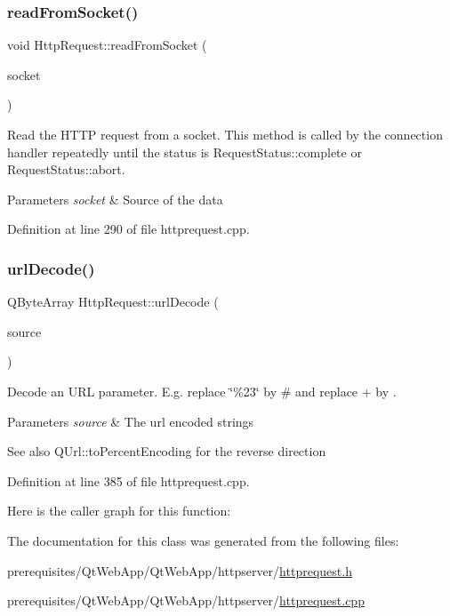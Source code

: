 \subsubsection{\texorpdfstring{read\+From\+Socket()}{readFromSocket()}}
{\footnotesize\ttfamily void Http\+Request\+::read\+From\+Socket (\begin{DoxyParamCaption}\item[{Q\+Tcp\+Socket $\ast$}]{socket }\end{DoxyParamCaption})}

Read the H\+T\+TP request from a socket. This method is called by the connection handler repeatedly until the status is Request\+Status\+::complete or Request\+Status\+::abort. 
\begin{DoxyParams}{Parameters}
{\em socket} & Source of the data \\
\hline
\end{DoxyParams}


Definition at line 290 of file httprequest.\+cpp.

\mbox{\label{classstefanfrings_1_1_http_request_a83651afcea6094403fb7cdb2d947cd0c}} 
\subsubsection{\texorpdfstring{url\+Decode()}{urlDecode()}}
{\footnotesize\ttfamily Q\+Byte\+Array Http\+Request\+::url\+Decode (\begin{DoxyParamCaption}\item[{const Q\+Byte\+Array}]{source }\end{DoxyParamCaption})\hspace{0.3cm}{\ttfamily [static]}}

Decode an U\+RL parameter. E.\+g. replace \char`\"{}\%23\char`\"{} by \textquotesingle{}\#\textquotesingle{} and replace \textquotesingle{}+\textquotesingle{} by \textquotesingle{} \textquotesingle{}. 
\begin{DoxyParams}{Parameters}
{\em source} & The url encoded strings \\
\hline
\end{DoxyParams}
\begin{DoxySeeAlso}{See also}
Q\+Url\+::to\+Percent\+Encoding for the reverse direction 
\end{DoxySeeAlso}


Definition at line 385 of file httprequest.\+cpp.

Here is the caller graph for this function\+:


The documentation for this class was generated from the following files\+:\begin{DoxyCompactItemize}
\item 
prerequisites/\+Qt\+Web\+App/\+Qt\+Web\+App/httpserver/\mbox{\hyperlink{httprequest_8h}{httprequest.\+h}}\item 
prerequisites/\+Qt\+Web\+App/\+Qt\+Web\+App/httpserver/\mbox{\hyperlink{httprequest_8cpp}{httprequest.\+cpp}}\end{DoxyCompactItemize}
